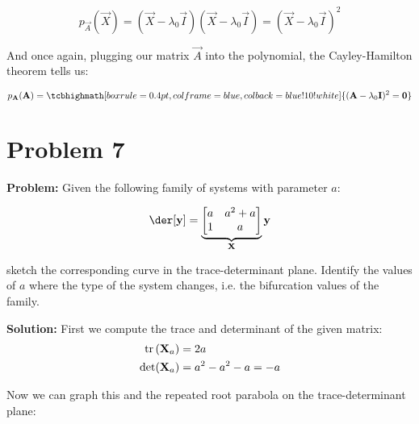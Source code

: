 \documentclass{article}
\begin{document}
\begin{equation*}
  p_{\vec A}(\vec X)=(\vec X-\lambda_0\vec I)(\vec X-\lambda_0\vec I)=(\vec X-\lambda_0\vec I)^2
\end{equation*}
\smallskip

And once again, plugging our matrix $\vec A$ into the polynomial, the Cayley-Hamilton theorem tells us:

\begin{equation*}
  p_{\vec A}(\vec A)=\tcbhighmath[boxrule=0.4pt,colframe=blue,colback=blue!10!white]{(\vec A-\lambda_0\vec I)^2=\vec 0}
\end{equation*}

\section*{Problem 7}
\noindent\textbf{Problem:} Given the following family of systems with parameter $a$:

\begin{equation*}
  \der[\vec y]=\underbrace{\begin{bmatrix}
    a&a^2+a\\1&a
  \end{bmatrix}}_{\vec X}\vec y
\end{equation*}

sketch the corresponding curve in the trace-determinant plane. Identify the values of $a$ where the type of the system changes, i.e. the bifurcation values of the family.
\bigskip

\noindent\textbf{Solution:} First we compute the trace and determinant of the given matrix:
\begin{align*}
  \text{tr}\left(\mathbf{X}_a\right)&=2a\\
  \det(\mathbf{X}_a)&=a^2-a^2-a=-a
\end{align*}


Now we can graph this and the repeated root parabola on the trace-determinant plane:
\end{document}
